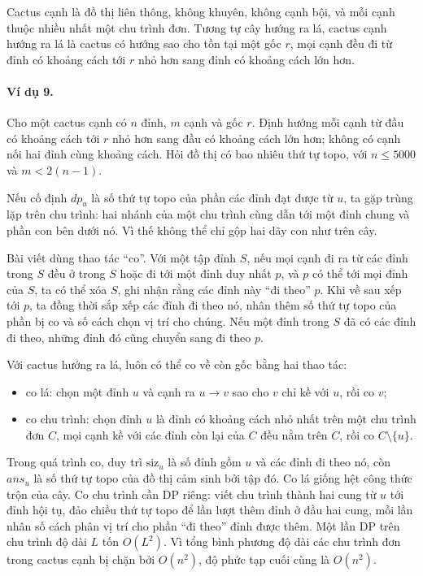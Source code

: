 \documentclass[11pt]{article}
\begin{document}
Cactus cạnh là đồ thị liên thông, không khuyên, không cạnh bội, và mỗi cạnh
thuộc nhiều nhất một chu trình đơn. Tương tự cây hướng ra lá, cactus cạnh hướng
ra lá là cactus có hướng sao cho tồn tại một gốc \(r\), mọi cạnh đều đi từ đỉnh
có khoảng cách tới \(r\) nhỏ hơn sang đỉnh có khoảng cách lớn hơn.

\paragraph{Ví dụ 9.}
Cho một cactus cạnh có \(n\) đỉnh, \(m\) cạnh và gốc \(r\). Định hướng mỗi cạnh
từ đầu có khoảng cách tới \(r\) nhỏ hơn sang đầu có khoảng cách lớn hơn; không
có cạnh nối hai đỉnh cùng khoảng cách. Hỏi đồ thị có bao nhiêu thứ tự topo, với
\(n\le 5000\) và \(m<2(n-1)\).

Nếu cố định \(dp_u\) là số thứ tự topo của phần các đỉnh đạt được từ \(u\), ta
gặp trùng lặp trên chu trình: hai nhánh của một chu trình cùng dẫn tới một đỉnh
chung và phần con bên dưới nó. Vì thế không thể chỉ gộp hai dãy con như trên
cây.


Bài viết dùng thao tác ``co''. Với một tập đỉnh \(S\), nếu mọi cạnh đi ra từ
các đỉnh trong \(S\) đều ở trong \(S\) hoặc đi tới một đỉnh duy nhất \(p\), và
\(p\) có thể tới mọi đỉnh của \(S\), ta có thể xóa \(S\), ghi nhận rằng các
đỉnh này ``đi theo'' \(p\). Khi về sau xếp tới \(p\), ta đồng thời sắp xếp các
đỉnh đi theo nó, nhân thêm số thứ tự topo của phần bị co và số cách chọn vị trí
cho chúng. Nếu một đỉnh trong \(S\) đã có các đỉnh đi theo, những đỉnh đó cũng
chuyển sang đi theo \(p\).

Với cactus hướng ra lá, luôn có thể co về còn gốc bằng hai thao tác:
\begin{itemize}
  \item co lá: chọn một đỉnh \(u\) và cạnh ra \(u\to v\) sao cho \(v\) chỉ kề
  với \(u\), rồi co \(v\);
  \item co chu trình: chọn đỉnh \(u\) là đỉnh có khoảng cách nhỏ nhất trên một
  chu trình đơn \(C\), mọi cạnh kề với các đỉnh còn lại của \(C\) đều nằm trên
  \(C\), rồi co \(C\setminus\{u\}\).
\end{itemize}


Trong quá trình co, duy trì \(\mathrm{siz}_u\) là số đỉnh gồm \(u\) và các đỉnh
đi theo nó, còn \(ans_u\) là số thứ tự topo của đồ thị cảm sinh bởi tập đó. Co
lá giống hệt công thức trộn của cây. Co chu trình cần DP riêng: viết chu trình
thành hai cung từ \(u\) tới đỉnh hội tụ, đảo chiều thứ tự topo để lần lượt thêm
đỉnh ở đầu hai cung, mỗi lần nhân số cách phân vị trí cho phần ``đi theo'' đỉnh
được thêm. Một lần DP trên chu trình độ dài \(L\) tốn \(O(L^2)\). Vì tổng bình
phương độ dài các chu trình đơn trong cactus cạnh bị chặn bởi \(O(n^2)\), độ
phức tạp cuối cùng là \(O(n^2)\).
\end{document}
